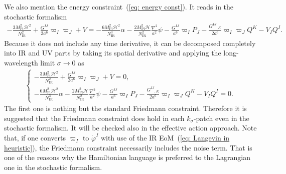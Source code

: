 \documentclass[a4paper,11pt]{article}
\newcommand{\Mpl}{M_\text{Pl}}
\newcommand{\IR}{\text{IR}}
\newcommand{\dps}{\displaystyle}
\newcommand{\calH}{\mathcal{H}}
\newcommand{\bae}[1]{\begin{align} #1 \end{align}}
\newcommand{\bce}[1]{\begin{cases} #1 \end{cases}}
\begin{document}
We also mention the energy constraint~(\ref{eq: energy const}). It reads in the stochastic formalism
\bae{
	-\frac{3\Mpl^2\calH^2}{N_\IR^2}+\frac{G^{IJ}}{2a^6}\varpi_I\varpi_J+V=-\frac{6\Mpl^2\calH^2}{N_\IR^3}\alpha
	-\frac{2\Mpl^2\calH}{N_\IR^2}\frac{\nabla^2}{a^2}\psi-\frac{G^{IJ}}{a^6}\varpi_IP_J-\frac{G^{IJ}{}_{,K}}{2a^6}\varpi_I\varpi_JQ^K-V_IQ^I.
}
Because it does not include any time derivative, it can be decomposed completely into IR and UV parts by taking its spatial derivative and applying the 
long-wavelength limit $\sigma\to0$ as 
\bae{\label{eq: perturbation energy const}
	\bce{
		\dps
		-\frac{3\Mpl^2\calH^2}{N_\IR^2}+\frac{G^{IJ}}{2a^6}\varpi_I\varpi_J+V=0, \\[10pt]
		\dps
		-\frac{6\Mpl^2\calH^2}{N_\IR^3}\alpha-\frac{2\Mpl^2\calH}{N_\IR^2}\frac{\nabla^2}{a^2}\psi
		-\frac{G^{IJ}}{a^6}\varpi_IP_J-\frac{G^{IJ}{}_{,K}}{2a^6}\varpi_I\varpi_JQ^K-V_IQ^I=0.
	}
}
The first one is nothing but the standard Friedmann constraint. Therefore it is suggested that the Friedmann constraint does hold in each 
$k_\sigma$-patch
even in the stochastic formalism. It will be checked also in the effective action approach. Note that, if one converts $\varpi_I$ to $\dot{\varphi}^I$
with use of the IR EoM~(\ref{eq: Langevin in heuristic}), the Friedmann constraint necessarily includes the noise term.
That is one of the reasons why the Hamiltonian language is preferred to the Lagrangian one in the stochastic formalism.







\end{document}
